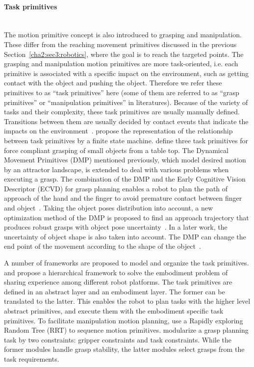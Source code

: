 \paragraph{Task primitives}
\label{cha2:sec3:robotics:taskprimitives}
~\\
The motion primitive concept is also introduced to grasping and manipulation. These differ from the reaching movement primitives discussed in the previous Section~\ref{cha2:sec3:robotics}, where the goal is to reach the targeted points. The grasping and manipulation motion primitives are more task-oriented, i.e. each primitive is associated with a specific impact on the environment, such as getting contact with the object and pushing the object. Therefore we refer these primitives to as ``task primitives'' here (some of them are referred to as ``grasp primitives'' or ``manipulation primitives'' in literatures). Because of the variety of tasks and their complexity, these task primitives are usually manually defined. Transitions between them are usually decided by contact events that indicate the impacts on the environment~\citep{morrow1997manipulation}. \citet{michelman1994forming} propose the representation of the relationship between task primitives by a finite state machine. \citet{kazemi2012robust} define three task primitives for force compliant grasping of small objects from a table top. The Dynamical Movement Primitives (DMP) mentioned previously, which model desired motion by an attractor landscape, is extended to deal with various problems when executing a grasp. The combination of the DMP and the Early Cognitive Vision Descriptor (ECVD) for grasp planning enables a robot to plan the path of approach of the hand and the finger to avoid premature contact between finger and object~\citep{kroemer2011grasping}. Taking the object poses distribution into account, a new optimization method of the DMP is proposed to find an approach trajectory that produces robust grasps with object pose uncertainty~\citep{stulp2011learning}. In a later work, the uncertainty of object shape is also taken into account. The DMP can change the end point of the movement according to the shape of the object~\citep{stulp2012reinforcement}.

A number of frameworks are proposed to model and organize the task primitives. \citet{laaksonen2010embodiment} and \citet{felip2013manipulation} propose a hierarchical framework to solve the embodiment problem of sharing experience among different robot platforms. The task primitives are defined in an abstract layer and an embodiment layer.
The former can be translated to the latter. This enables the robot to plan tasks with the higher level abstract primitives, and execute them with the embodiment specific task primitives. To facilitate manipulation motion planning, \citet{barry2013manipulation} use a Rapidly exploring Random Tree (RRT) to sequence motion primitives. \citet{detry2013generalizing} modularize a grasp planning task by two constraints: gripper constraints and task constraints. While the former modules handle grasp stability, the latter modules select grasps from the task requirements.

